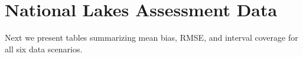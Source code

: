 \documentclass[]{elsarticle} %
\begin{document}
\begin{table}[ht]
\centering
{}
\caption{Sampling-inference combination (Approach), population layout (Layout), response type (Response), proportion of dependent random error (DRE\%), sample size (n), mean bias (MBias), root-mean-squared error (RMSE), and 95\% interval coverage (Coverage) in simulation scenario 36.} 
\end{table}

\clearpage

\hypertarget{sec:datatabs}{%
\section{National Lakes Assessment Data}\label{sec:datatabs}}

Next we present tables summarizing mean bias, RMSE, and interval
coverage for all six data scenarios.
\end{document}
